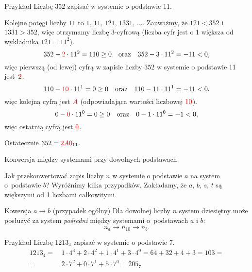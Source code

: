 \documentclass[a4paper,10pt]{beamer}
\begin{document}
\begin{frame}
	\begin{exampleblock}{Przykład}
		Liczbę 352 zapisać w systemie o podstawie 11.
		
		Kolejne potęgi liczby $11$ to $1,\,11,\,121,\,1331,\,\ldots$. Zauważmy, że $121<352$ i~$1331>352$, więc otrzymamy liczbę 3-cyfrową (liczba cyfr jest o 1 większa od wykładnika $121=11^2$).
		$$352-\textcolor{red}{2}\cdot11^2=110\geq0\ \ \mbox{ oraz }\ \ 352-3\cdot11^2=-11<0,$$
		więc pierwszą (od lewej) cyfrą w zapisie liczby $352$ w systemie o podstawie 11 jest~$\textcolor{red}{2}$.
		$$110-\textcolor{red}{10}\cdot11^1=0\geq0\ \ \mbox{ oraz }\ \ 110-11\cdot11^1=-11<0,$$
		więc kolejną cyfrą jest $\textcolor{red}{A}$ (odpowiadająca wartości liczbowej $\textcolor{red}{10}$).
		$$0-\textcolor{red}{0}\cdot11^0=0\geq0\ \ \mbox{ oraz }\ \ 0-1\cdot11^0=-1<0,$$
		więc ostatnią cyfrą jest $\textcolor{red}{0}$.
		
		Ostatecznie $352=\textcolor{red}{2A0}_{11}$.
	\end{exampleblock}
\end{frame}







\begin{frame}{Konwersja między systemami przy dowolnych podstawach}
	
	Jak przekonwertować zapis liczby $n$ w systemie o podstawie $a$ na system o~podstawie $b$? Wyróżnimy kilka przypadków. Zakładamy, że $a$, $b$, $s$, $t$ są większymi od 1 liczbami całkowitymi.
	
	\begin{block}{Kowersja $a\to b$ (przypadek ogólny)}
		Dla dowolnej liczby $n$ system dziesiętny może posłużyć za system {\it pośredni} między systemami o~podstawach $a$ i $b$: $$n_a\to n_{10}\to n_b.$$	
	\end{block}


	\begin{exampleblock}{Przykład}
		Liczbę $1213_4$ zapisać w systemie o podstawie 7.	
		\begin{align*}
			1213_4=&\,1\cdot4^3+2\cdot4^2+1\cdot4^1+3\cdot4^0=64+32+4+3=103=\\
			=&\,2\cdot7^2+0\cdot7^1+5\cdot7^0=205_7
		\end{align*}
	
	\end{exampleblock}
	
\end{frame}
\end{document}
